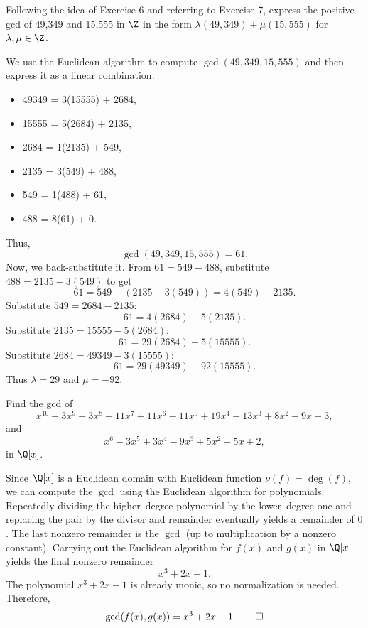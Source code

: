 \begin{problem}[35.8]
  Following the idea of Exercise 6 and referring to Exercise 7, express the positive gcd of 49,349 and 15,555 in $\Z$ in the form $\lambda(49,349) + \mu(15,555)$ for $\lambda, \mu \in \Z$.
\end{problem}

\begin{solution}
  We use the Euclidean algorithm to compute $\gcd(49{,}349,15{,}555)$ and then express it as a linear combination.
  \begin{itemize}
    \item 49349 = 3(15555) + 2684,
    \item 15555 = 5(2684) + 2135,
    \item 2684 = 1(2135) + 549,
    \item 2135 = 3(549) + 488,
    \item 549 = 1(488) + 61,
    \item 488 = 8(61) + 0.
  \end{itemize}
  Thus,
  \[%
    \gcd(49{,}349,15{,}555) = 61
  .\]%
  Now, we back-substitute it. From $61 = 549 - 488$, substitute $488 = 2135 - 3(549)$ to get
  \[%
    61 = 549 - (2135 - 3(549)) = 4(549) - 2135
  .\]%
  Substitute $549 = 2684 - 2135$:
  \[%
    61 = 4(2684) - 5(2135)
  .\]%
  Substitute $2135 = 15555 - 5(2684)$:
  \[%
    61 = 29(2684) - 5(15555)
  .\]%
  Substitute $2684 = 49349 - 3(15555)$:
  \[%
    61 = 29(49349) - 92(15555)
  .\]%
  Thus $\lambda = 29$ and $\mu = -92$.
\end{solution}

\begin{problem}[35.9]
  Find the gcd of
  \[%
    x^{10} - 3x^9 + 3x^8 - 11x^7 + 11x^6 - 11x^5 + 19x^4 - 13x^3 + 8x^2 - 9x + 3
  ,\]%
  and
  \[%
    x^6 - 3x^5 + 3x^4 - 9x^3 + 5x^2 - 5x + 2
  ,\]%
  in $\Q[x]$.
\end{problem}

\begin{solution}
  Since $\Q[x]$ is a Euclidean domain with Euclidean function $\nu(f)=\deg(f)$, we can compute the $\gcd$ using the Euclidean algorithm for polynomials. Repeatedly dividing the higher–degree polynomial by the lower–degree one and replacing the pair by the divisor and remainder eventually yields a remainder of $0$. The last nonzero remainder is the $\gcd$ (up to multiplication by a nonzero constant). Carrying out the Euclidean algorithm for $f(x)$ and $g(x)$ in $\Q[x]$ yields the final nonzero remainder
  \[%
    x^3 + 2x - 1
  .\]%
  The polynomial $x^3 + 2x - 1$ is already monic, so no normalization is needed. Therefore,
  \[%
    \gcd(f(x),g(x)) = x^3 + 2x - 1
  .\qedhere\]%
\end{solution}

